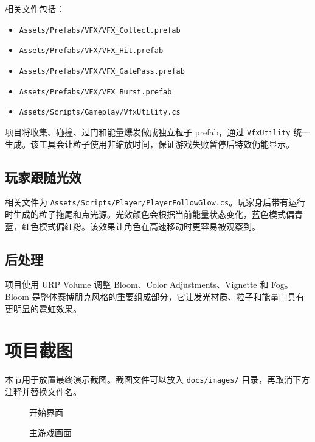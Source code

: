 \documentclass[UTF8,a4paper,12pt]{ctexart}
\begin{document}
相关文件包括：

\begin{itemize}
  \item \texttt{Assets/Prefabs/VFX/VFX\_Collect.prefab}
  \item \texttt{Assets/Prefabs/VFX/VFX\_Hit.prefab}
  \item \texttt{Assets/Prefabs/VFX/VFX\_GatePass.prefab}
  \item \texttt{Assets/Prefabs/VFX/VFX\_Burst.prefab}
  \item \texttt{Assets/Scripts/Gameplay/VfxUtility.cs}
\end{itemize}

项目将收集、碰撞、过门和能量爆发做成独立粒子 prefab，通过 \texttt{VfxUtility} 统一生成。该工具会让粒子使用非缩放时间，保证游戏失败暂停后特效仍能显示。

\subsection{玩家跟随光效}

相关文件为 \texttt{Assets/Scripts/Player/PlayerFollowGlow.cs}。玩家身后带有运行时生成的粒子拖尾和点光源。光效颜色会根据当前能量状态变化，蓝色模式偏青蓝，红色模式偏红粉。该效果让角色在高速移动时更容易被观察到。

\subsection{后处理}

项目使用 URP Volume 调整 Bloom、Color Adjustments、Vignette 和 Fog。Bloom 是整体赛博朋克风格的重要组成部分，它让发光材质、粒子和能量门具有更明显的霓虹效果。

\section{项目截图}

本节用于放置最终演示截图。截图文件可以放入 \texttt{docs/images/} 目录，再取消下方注释并替换文件名。

\begin{figure}[H]
  \centering
  \caption{开始界面}
\end{figure}

\begin{figure}[H]
  \centering
  \caption{主游戏画面}
\end{figure}
\end{document}
